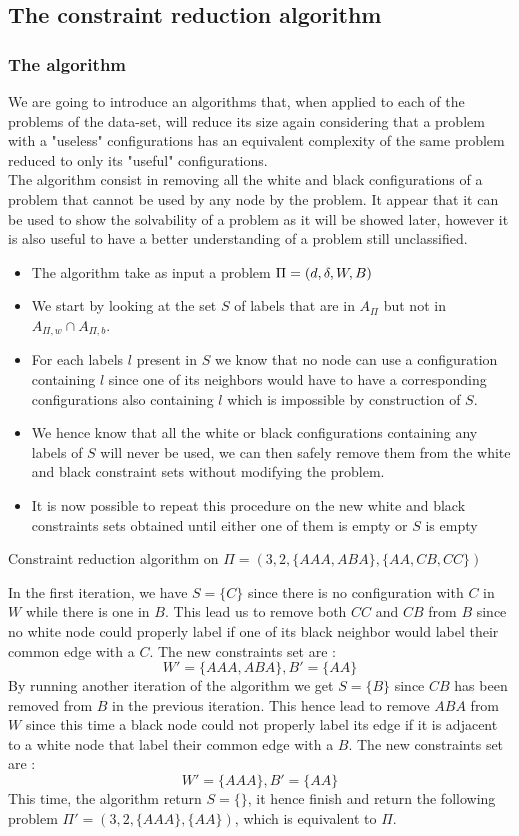 \subsection{The constraint reduction algorithm}\label{sec:CR}

\subsubsection{The algorithm}
We are going to introduce an algorithms that, when applied to each of the problems of the data-set, will reduce its size again considering that a problem with a "useless" configurations has an equivalent complexity of the same problem reduced to only its "useful" configurations.\\

The algorithm consist in removing all the white and black configurations of a problem that cannot be used by any node by the problem. It appear that it can be used to show the solvability of a problem as it will be showed later, however it is also useful to have a better understanding of a problem still unclassified.
\begin{itemize}
    \item The algorithm take as input a problem $\Pi = (d,\delta,W,B)$
    \item We start by looking at the set $S$ of labels that are in $A_{\Pi}$ but not in  $A_{\Pi,w} \cap A_{\Pi,b}$.
    \item For each labels $l$ present in $S$ we know that no node can use a configuration containing $l$ since one of its neighbors would have to have a corresponding configurations also containing $l$ which is impossible by construction of $S$.
    \item We hence know that all the white or black configurations containing any labels of $S$ will never be used, we can then safely remove them from the white and black constraint sets without modifying the problem.
    \item It is now possible to repeat this procedure on the new white and black constraints sets obtained until either one of them is empty or $S$ is empty
\end{itemize}
\begin{exmp} Constraint reduction algorithm on $\Pi = (3, 2, \{AAA, ABA\}, \{AA, CB, CC\})$

In the first iteration, we have $S = \{C\}$ since there is no configuration with $C$ in $W$ while there is one in $B$.
This lead us to remove both $CC$ and $CB$ from $B$ since no white node could properly label if one of its black neighbor would label their common edge with a $C$.
The new constraints set are :
$$W' = \{AAA, ABA\}, B' = \{AA\}$$
By running another iteration of the algorithm we get $S = \{B\}$ since $CB$ has been removed from $B$ in the previous iteration.
This hence lead to remove $ABA$ from $W$ since this time a black node could not properly label its edge if it is adjacent to a white node that label their common edge with a $B$.
The new constraints set are :
$$W' = \{AAA\}, B' = \{AA\}$$
This time, the algorithm return $S = \{\}$, it hence finish and return the following problem $\Pi' = (3, 2, \{AAA\}, \{AA\})$, which is equivalent to $\Pi$.
\end{exmp}

